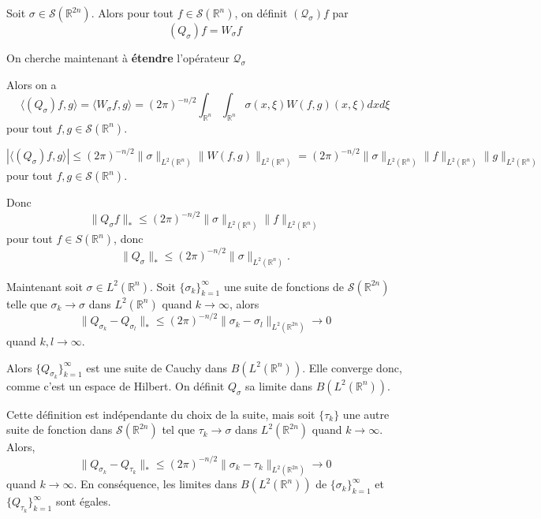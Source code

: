\documentclass[a4paper, 12pt]{report}
\newcommand{\R}{\mathbb{R}} %
\newcommand{\ra}[1][]{\overset{#1}{\rightarrow}} %
\renewcommand{\.}{\cdot} %
\theoremstyle{break}
\theoremstyle{remark}
\theoremstyle{proofstyle}
\begin{document}
\begin{preuve}
    Soit $\sigma \in \mathcal{S}(\R^{2n})$. Alors pour tout $f \in \mathcal{S}(\R^n)$, on définit $(\mathcal{Q}_\sigma) f$ par
    $$(Q_\sigma) f = W_\sigma f$$

    On cherche maintenant à \textbf{étendre} l'opérateur $\mathcal{Q_\sigma}$\vspace{5pt}

    Alors on a $$\langle(Q_\sigma)f, g \rangle = \langle W_\sigma f, g \rangle = (2 \pi)^{-n/2} \int_{\R^n} \int_{\R^n} \sigma (x, \xi) W(f,g)(x, \xi) dx d\xi$$ pour tout $f, g \in \mathcal{S}(\R^n)$.



    $$|\langle (Q_\sigma)f, g \rangle| \leq (2 \pi)^{-n/2} \|\sigma\|_{L^2(\R^n)} \|W(f,g)\|_{L^2(\R^n)} = (2 \pi)^{-n/2} \|\sigma\|_{L^2(\R^n)} \|f\|_{L^2(\R^n)} \|g\|_{L^2(\R^n)}$$ pour tout $f, g \in \mathcal{S}(\R^n)$.\vspace{5pt}

    Donc
    $$\|Q_\sigma f\|_* \leq (2 \pi)^{-n/2} \|\sigma\|_{L^2(\R^n)} \|f\|_{L^2(\R^n)}$$ pour tout $f \in S(\R^n)$, donc
    $$\|Q_\sigma\|_* \leq (2 \pi)^{-n/2} \|\sigma\|_{L^2(\R^n)}. $$\vspace{10pt}



    Maintenant soit $\sigma \in L^2(\R^n).$ Soit $\{\sigma_k\}_{k=1}^\infty$ une suite de fonctions de $\mathcal{S}(\R^{2n})$ telle que $\sigma_k \ra \sigma$ dans $L^2(\R^n)$ quand $k \ra \infty$, alors
    $$\|Q_{\sigma_k}-Q_{\sigma_l}\|_* \leq (2 \pi)^{-n/2} \|\sigma_k - \sigma _l\|_{L^2(\R^{2n})} \ra 0$$ quand $k, l \ra \infty$.\vspace{4pt}

    Alors $\{Q_{\sigma_k}\}_{k=1}^\infty$ est une suite de Cauchy dans $B(L^2(\R^n))$. Elle converge donc, comme c'est un espace de Hilbert. On définit $Q_\sigma$ sa limite dans $B(L^2(\R^n))$. \vspace{4pt}

    Cette définition est indépendante du choix de la suite, mais soit $\{\tau_k\}$ une autre suite de fonction dans $\mathcal{S}(\R^{2n})$ tel que $\tau_k \ra \sigma$ dans $L^2(\R^{2n})$ quand $k \ra \infty$. Alors,
    $$\|Q_{\sigma_k}- Q_{\tau_k}\|_* \leq (2 \pi)^{-n/2} \|\sigma _k - \tau _k\|_{L^2(\R^{2n})} \ra 0$$ quand $k \ra \infty$. En conséquence, les limites dans $B(L^2(\R^n))$ de $\{\sigma _k\}_{k=1}^\infty$ et $\{Q_{\tau_ k}\}_{k=1}^\infty$ sont égales.  \vspace{5pt}


\end{preuve}
\end{document}
